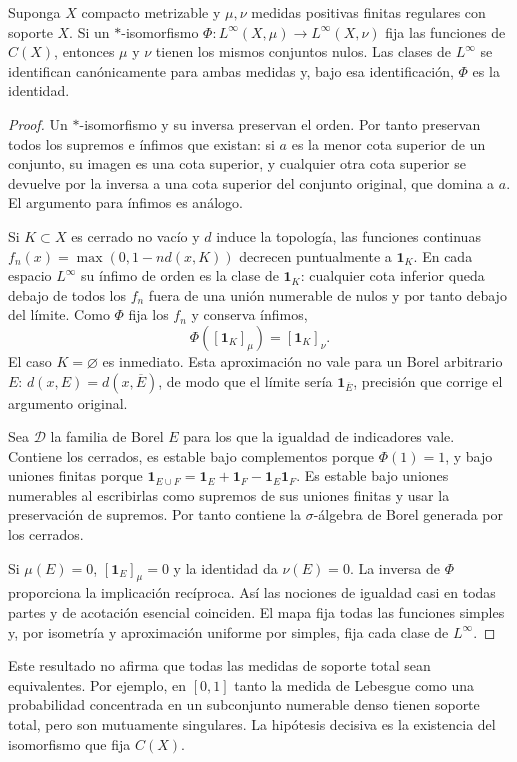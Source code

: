 \begin{teorema}\label{v3:unicidad-clase-medida}
Suponga $X$ compacto metrizable y $\mu,\nu$ medidas positivas finitas regulares con soporte $X$. Si un $*$-isomorfismo
$\Phi:L^\infty(X,\mu)\to L^\infty(X,\nu)$ fija las funciones de $C(X)$, entonces $\mu$ y $\nu$ tienen los mismos conjuntos nulos. Las clases de $L^\infty$ se identifican canónicamente para ambas medidas y, bajo esa identificación, $\Phi$ es la identidad.
\end{teorema}
\begin{proof}
Un $*$-isomorfismo y su inversa preservan el orden. Por tanto preservan todos los supremos e ínfimos que existan: si $a$ es la menor cota superior de un conjunto, su imagen es una cota superior, y cualquier otra cota superior se devuelve por la inversa a una cota superior del conjunto original, que domina a $a$. El argumento para ínfimos es análogo.

Si $K\subset X$ es cerrado no vacío y $d$ induce la topología, las funciones continuas $f_n(x)=\max(0,1-nd(x,K))$ decrecen puntualmente a $\mathbf1_K$. En cada espacio $L^\infty$ su ínfimo de orden es la clase de $\mathbf1_K$: cualquier cota inferior queda debajo de todos los $f_n$ fuera de una unión numerable de nulos y por tanto debajo del límite. Como $\Phi$ fija los $f_n$ y conserva ínfimos,
\[
 \Phi([\mathbf1_K]_\mu)=[\mathbf1_K]_\nu.
\]
El caso $K=\varnothing$ es inmediato. Esta aproximación no vale para un Borel arbitrario $E$: $d(x,E)=d(x,\overline E)$, de modo que el límite sería $\mathbf1_{\overline E}$, precisión que corrige el argumento original.

Sea $\mathcal D$ la familia de Borel $E$ para los que la igualdad de indicadores vale. Contiene los cerrados, es estable bajo complementos porque $\Phi(1)=1$, y bajo uniones finitas porque $\mathbf1_{E\cup F}=\mathbf1_E+\mathbf1_F-\mathbf1_E\mathbf1_F$. Es estable bajo uniones numerables al escribirlas como supremos de sus uniones finitas y usar la preservación de supremos. Por tanto contiene la $\sigma$-álgebra de Borel generada por los cerrados.

Si $\mu(E)=0$, $[\mathbf1_E]_\mu=0$ y la identidad da $\nu(E)=0$. La inversa de $\Phi$ proporciona la implicación recíproca. Así las nociones de igualdad casi en todas partes y de acotación esencial coinciden. El mapa fija todas las funciones simples y, por isometría y aproximación uniforme por simples, fija cada clase de $L^\infty$.
\end{proof}

Este resultado no afirma que todas las medidas de soporte total sean equivalentes. Por ejemplo, en $[0,1]$ tanto la medida de Lebesgue como una probabilidad concentrada en un subconjunto numerable denso tienen soporte total, pero son mutuamente singulares. La hipótesis decisiva es la existencia del isomorfismo que fija $C(X)$.

